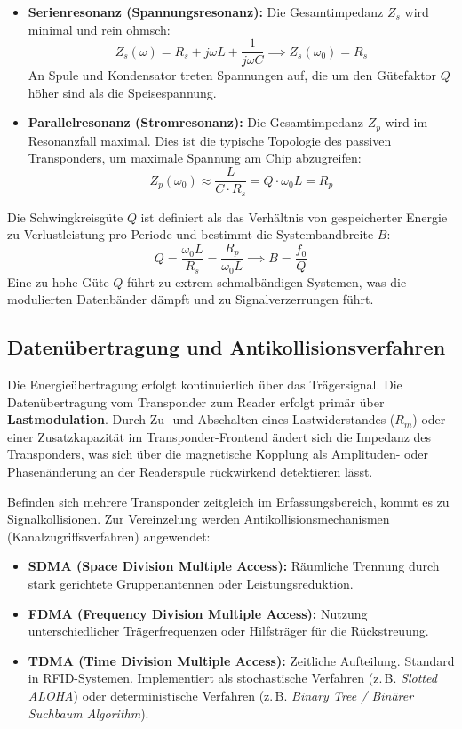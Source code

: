 \documentclass[8pt,a4paper]{article}
\begin{document}
\begin{itemize}
    \item \textbf{Serienresonanz (Spannungsresonanz):} Die Gesamtimpedanz $Z_s$ wird minimal und rein ohmsch:
    \begin{equation}
        Z_s(\omega) = R_s + j\omega L + \frac{1}{j\omega C} \implies Z_s(\omega_0) = R_s
    \end{equation}
    An Spule und Kondensator treten Spannungen auf, die um den Gütefaktor $Q$ höher sind als die Speisespannung.
    \item \textbf{Parallelresonanz (Stromresonanz):} Die Gesamtimpedanz $Z_p$ wird im Resonanzfall maximal. Dies ist die typische Topologie des passiven Transponders, um maximale Spannung am Chip abzugreifen:
    \begin{equation}
        Z_p(\omega_0) \approx \frac{L}{C \cdot R_s} = Q \cdot \omega_0 L = R_p
    \end{equation}
\end{itemize}
Die Schwingkreisgüte $Q$ ist definiert als das Verhältnis von gespeicherter Energie zu Verlustleistung pro Periode und bestimmt die Systembandbreite $B$:
\begin{equation}
    Q = \frac{\omega_0 L}{R_s} = \frac{R_p}{\omega_0 L} \implies B = \frac{f_0}{Q}
\end{equation}
Eine zu hohe Güte $Q$ führt zu extrem schmalbändigen Systemen, was die modulierten Datenbänder dämpft und zu Signalverzerrungen führt.

\subsection{Datenübertragung und Antikollisionsverfahren}
Die Energieübertragung erfolgt kontinuierlich über das Trägersignal. Die Datenübertragung vom Transponder zum Reader erfolgt primär über \textbf{Lastmodulation}. Durch Zu- und Abschalten eines Lastwiderstandes ($R_m$) oder einer Zusatzkapazität im Transponder-Frontend ändert sich die Impedanz des Transponders, was sich über die magnetische Kopplung als Amplituden- oder Phasenänderung an der Readerspule rückwirkend detektieren lässt.

Befinden sich mehrere Transponder zeitgleich im Erfassungsbereich, kommt es zu Signalkollisionen. Zur Vereinzelung werden Antikollisionsmechanismen (Kanalzugriffsverfahren) angewendet:
\begin{itemize}
    \item \textbf{SDMA (Space Division Multiple Access):} Räumliche Trennung durch stark gerichtete Gruppenantennen oder Leistungsreduktion.
    \item \textbf{FDMA (Frequency Division Multiple Access):} Nutzung unterschiedlicher Trägerfrequenzen oder Hilfsträger für die Rückstreuung.
    \item \textbf{TDMA (Time Division Multiple Access):} Zeitliche Aufteilung. Standard in RFID-Systemen. Implementiert als stochastische Verfahren (z.\,B. \textit{Slotted ALOHA}) oder deterministische Verfahren (z.\,B. \textit{Binary Tree / Binärer Suchbaum Algorithm}).
\end{itemize}
\end{document}
